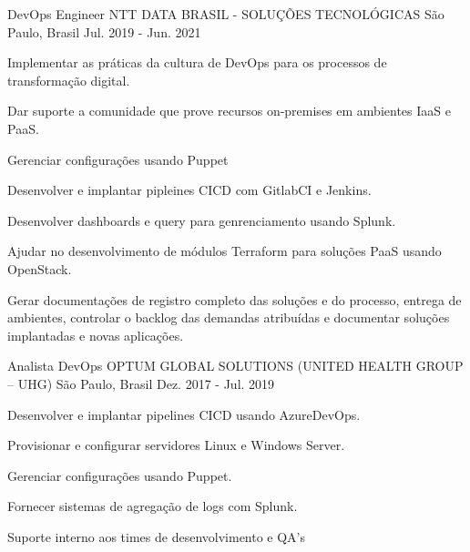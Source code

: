 \begin{cventries}
  \cventry
    {DevOps Engineer} %
    {NTT DATA BRASIL - SOLUÇÕES TECNOLÓGICAS} %
    {São Paulo, Brasil} %
    {Jul. 2019 - Jun. 2021} %
    {
      \begin{cvitems} %
        \item {Implementar as práticas da cultura de DevOps para os processos de transformação digital.}
        \item {Dar suporte a comunidade que prove recursos on-premises em ambientes IaaS e PaaS.}
        \item {Gerenciar configurações usando Puppet}
        \item {Desenvolver e implantar pipleines CICD com GitlabCI e Jenkins.}
        \item {Desenvolver dashboards e query para genrenciamento usando Splunk.}
        \item {Ajudar no desenvolvimento de módulos Terraform para soluções PaaS usando OpenStack.}
        \item {Gerar documentações de registro completo das soluções e do processo, entrega de ambientes, controlar o backlog das demandas atribuídas e documentar soluções implantadas e novas aplicações.}
      \end{cvitems}
    }
  \break
  
  \cventry
    {Analista DevOps} %
    {OPTUM GLOBAL SOLUTIONS (UNITED HEALTH GROUP – UHG)} %
    {São Paulo, Brasil} %
    {Dez. 2017 - Jul. 2019} %
    {
      \begin{cvitems} %
        \item {Desenvolver e implantar pipelines CICD usando AzureDevOps.}
        \item {Provisionar e configurar servidores Linux e Windows Server.}
        \item {Gerenciar configurações usando Puppet.}
        \item {Fornecer sistemas de agregação de logs com Splunk.}
        \item {Suporte interno aos times de desenvolvimento e QA's}
      \end{cvitems}
    }


\end{cventries}